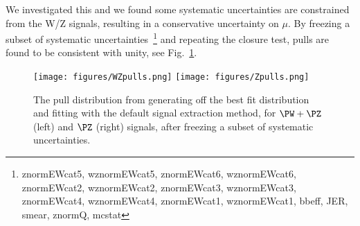 We investigated this and we found some systematic uncertainties are constrained from the W/Z signals, resulting in a conservative uncertainty on $\mu$.
By freezing a subset of systematic uncertainties~\footnote{znormEWcat5, wznormEWcat5, znormEWcat6, wznormEWcat6, znormEWcat2, wznormEWcat2, znormEWcat3, wznormEWcat3, znormEWcat4, wznormEWcat4, znormEWcat1, wznormEWcat1, bbeff, JER, smear, znormQ, mcstat} and repeating the closure test, pulls are found to be consistent with unity, see Fig.~\ref{fig:pullDataWZ1}.

\begin{figure}[hbtp]
\centering
\texttt{[image: figures/WZpulls.png]}
\texttt{[image: figures/Zpulls.png]}\\
 \caption{The pull distribution from generating off the best fit distribution and fitting with the default signal extraction method, for $\PW+\PZ$ (left) and $\PZ$ (right) signals, after freezing a subset of systematic uncertainties.}

 \label{fig:pullDataWZ1}
 \end{figure}


